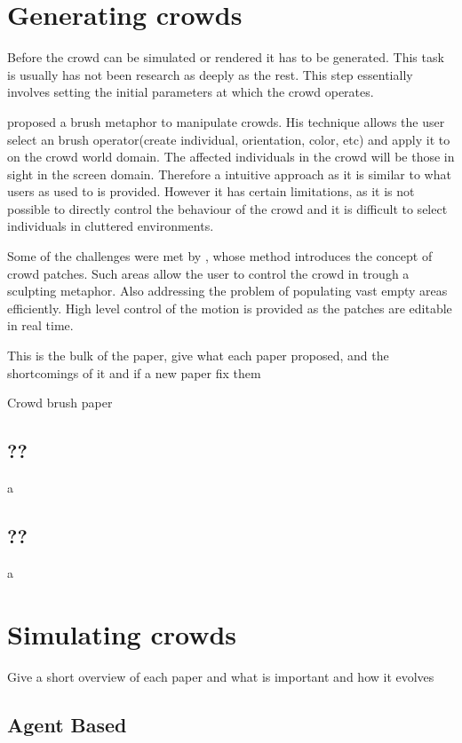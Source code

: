 \documentclass[11pt,twocolumn]{article}
\numberwithin{equation}{section} %
\numberwithin{figure}{section} %
\numberwithin{table}{section} %
\begin{document}
\section{Generating crowds}

Before the crowd can be simulated or rendered it has to be generated.
This task is usually has not been research as deeply as the rest.
This step essentially involves setting the initial parameters at which the crowd operates.

\cite{Ulicny2004} proposed a brush metaphor to manipulate crowds.
His technique allows the user select an brush operator(create individual, orientation, color, etc) and apply it to on the crowd world domain.
The affected individuals in the crowd will be those in sight in the screen domain.
Therefore a intuitive approach as it is similar to what users as used to is provided.
However it has certain limitations, as it is not possible to directly control the behaviour of the crowd and it is difficult to select individuals in cluttered environments.

Some of the challenges were met by \cite{Jordao2014}, whose method introduces the concept of crowd patches.
Such areas allow the user to control the crowd in trough a sculpting metaphor.
Also addressing the problem of populating vast empty areas efficiently.
High level control of the motion is provided as the patches are editable in real time.
  
This is the bulk of the paper, give what each paper proposed, and the shortcomings
of it and if a new paper fix them
 
Crowd brush paper

\subsection{??}

a

\subsection{??}

a

\section{Simulating crowds}

Give a short overview of each paper and what is important and how it evolves

\subsection{Agent Based}
\end{document}
